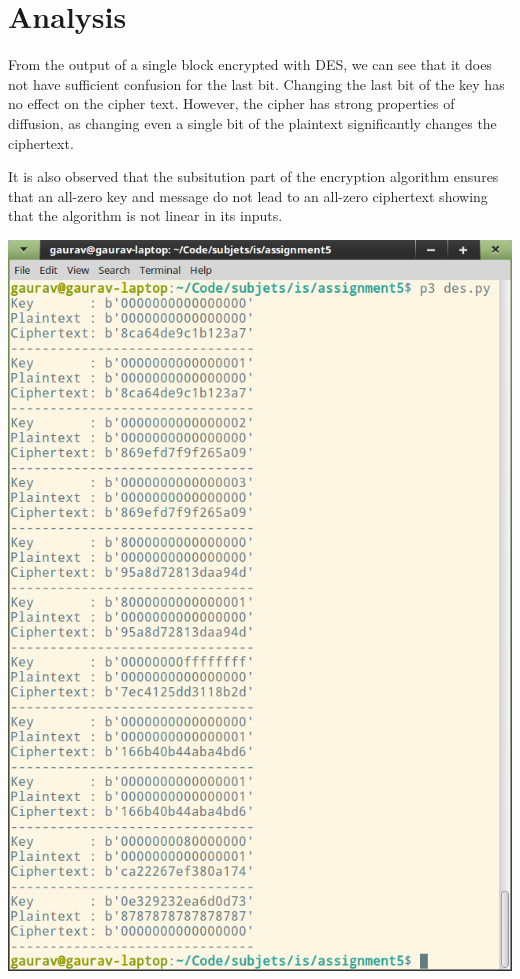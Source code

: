 \documentclass[main.tex]{subfiles}
\begin{document}
\section{Analysis}
From the output of a single block encrypted with DES, we can see that it does
not have sufficient confusion for the last bit. Changing the last bit of the key
has no effect on the cipher text. However, the cipher has strong properties of
diffusion, as changing even a single bit of the plaintext significantly changes
the ciphertext.

It is also observed that the subsitution part of the encryption algorithm
ensures that an all-zero key and message do not lead to an all-zero ciphertext
showing that the algorithm is not linear in its inputs.


\includegraphics[width=\textwidth]{output.png}
\end{document}
